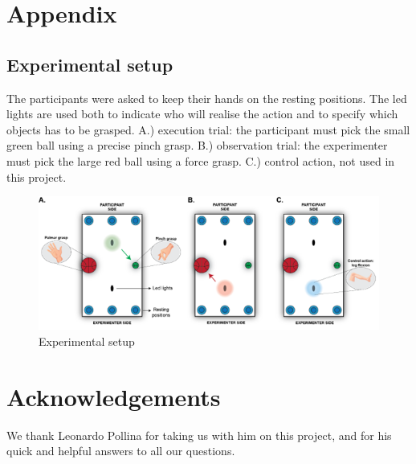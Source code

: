 \documentclass[10pt,conference,compsocconf]{IEEEtran}
\begin{document}


\section{Appendix}
\subsection{Experimental setup}
The participants were asked to keep their hands on the resting positions. The led lights are used both to indicate who will realise the action and to specify which objects has to be grasped. A.) execution trial: the participant must pick the small green ball using a precise pinch grasp. B.) observation trial: the experimenter must pick the large red ball using a force grasp. C.) control action, not used in this project.

\begin{figure}[h!]
    \center
    \includegraphics[width=\linewidth]{images/2024-12-11-13-41-23.png}
    \caption{Experimental setup}
\end{figure}
\FloatBarrier




\section*{Acknowledgements}
We thank Leonardo Pollina for taking us with him on this project, and for his quick and helpful answers to all our questions.



\end{document}
